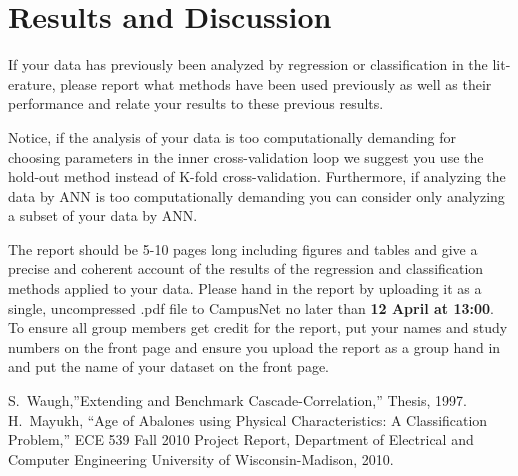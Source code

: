 \documentclass[10pt, paper=a4]{article}
\begin{document}




\section{Results and Discussion}
\label{sec:results_and_discussion}
If your data has previously been analyzed by regression or
classification in the lit- erature, please report what methods have
been used previously as well as their performance and relate your
results to these previous results.

Notice, if the analysis of your data is too computationally demanding
for choosing parameters in the inner cross-validation loop we suggest
you use the hold-out method instead of K-fold
cross-validation. Furthermore, if analyzing the data by ANN is too
computationally demanding you can consider only analyzing a subset of
your data by ANN.

The report should be 5-10 pages long including figures and tables and
give a precise and coherent account of the results of the regression
and classification methods applied to your data. Please hand in the
report by uploading it as a single, uncompressed .pdf file to
CampusNet no later than {\bf 12 April at 13:00}.  To ensure all group
members get credit for the report, put your names and study numbers on
the front page and ensure you upload the report as a group hand in and
put the name of your dataset on the front page.
\begin{thebibliography}{99}
 S.~Waugh,''Extending and Benchmark
  Cascade-Correlation,'' Thesis, 1997.
   H.~Mayukh, ``Age of Abalones using Physical
    Characteristics: A Classification Problem,'' ECE 539 Fall 2010
    Project Report, Department of Electrical and Computer Engineering
    University of Wisconsin-Madison, 2010.
\end{thebibliography}
\end{document}
